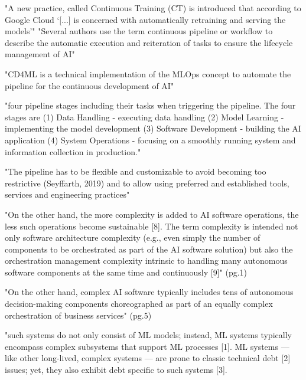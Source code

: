"A new practice, called Continuous Training (CT) is introduced that according
to Google Cloud ‘[...] is concerned with automatically retraining and serving
the models’"
"Several authors use the term continuous pipeline or workflow to describe the
automatic execution and reiteration of tasks to ensure the lifecycle management
of AI"

"CD4ML is a technical implementation of the MLOps concept to automate the
pipeline for the continuous development of AI"

"four pipeline stages including their tasks when triggering the pipeline.
The four stages are
(1) Data Handling - executing data handling
(2) Model Learning - implementing the model development
(3) Software Development - building the AI application
(4) System Operations - focusing on a smoothly running system
    and information collection in production."

"The pipeline has to be flexible and customizable to avoid becoming too
restrictive (Seyffarth, 2019) and to allow using preferred and established
tools, services and engineering practices"


\parencite{Tamburri2020SustainableChallenges}

"On the other hand, the more complexity is added to AI software operations, the
less such operations become sustainable [8]. The term complexity is intended not
only software architecture complexity (e.g., even simply the number of
components to be orchestrated as part of the AI software solution) but also the
orchestration management complexity intrinsic to handling many autonomous
software components at the same time and continuously [9]" (pg.1)

"On the other hand, complex AI software typically includes tens of autonomous
decision-making components choreographed as part of an equally complex
orchestration of business services" (pg.5)


\parencite{Tang2021AnSystems}

"such systems do not only consist of ML models; instead, ML systems typically
encompass complex subsystems that support ML processes [1]. ML systems — like
other long-lived, complex systems — are prone to classic technical debt [2]
issues; yet, they also exhibit debt specific to such systems [3].

